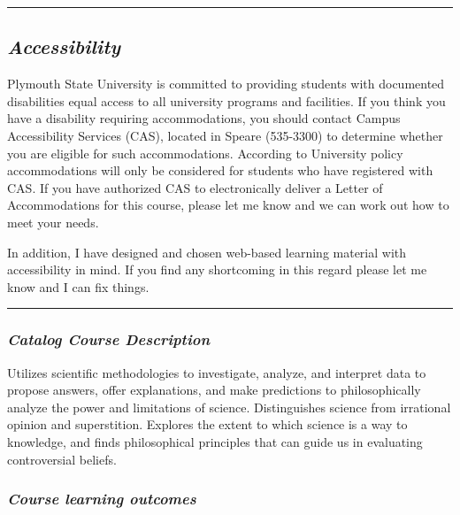 \documentclass[
]{article}
\begin{document}
\begin{center}\rule{0.5\linewidth}{0.5pt}\end{center}

\hypertarget{accessibility}{%
\subsection{\texorpdfstring{\emph{Accessibility}}{Accessibility}}\label{accessibility}}

\begin{infobox}

Plymouth State University is committed to providing students with
documented disabilities equal access to all university programs and
facilities. If you think you have a disability requiring accommodations,
you should contact Campus Accessibility Services (CAS), located in
Speare (535-3300) to determine whether you are eligible for such
accommodations. According to University policy accommodations will only
be considered for students who have registered with CAS. If you have
authorized CAS to electronically deliver a Letter of Accommodations for
this course, please let me know and we can work out how to meet your
needs.

In addition, I have designed and chosen web-based learning material with
accessibility in mind. If you find any shortcoming in this regard please
let me know and I can fix things.

\end{infobox}

\begin{center}\rule{0.5\linewidth}{0.5pt}\end{center}

\hypertarget{catalog-course-description}{%
\subsubsection{\texorpdfstring{\emph{Catalog Course
Description}}{Catalog Course Description}}\label{catalog-course-description}}

Utilizes scientific methodologies to investigate, analyze, and interpret
data to propose answers, offer explanations, and make predictions to
philosophically analyze the power and limitations of science.
Distinguishes science from irrational opinion and superstition. Explores
the extent to which science is a way to knowledge, and finds
philosophical principles that can guide us in evaluating controversial
beliefs.

\hypertarget{course-learning-outcomes}{%
\subsubsection{\texorpdfstring{\emph{Course learning
outcomes}}{Course learning outcomes}}\label{course-learning-outcomes}}
\end{document}
